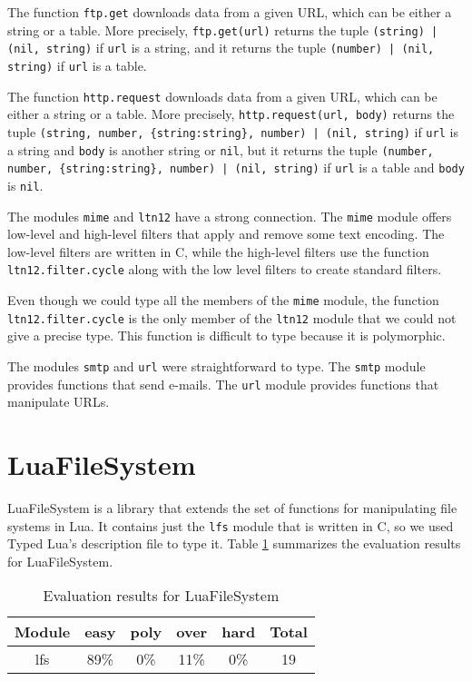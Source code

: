 The function \texttt{ftp.get} downloads data from a given URL,
which can be either a string or a table.
More precisely, \texttt{ftp.get(url)} returns the tuple
\texttt{(string) | (nil, string)} if \texttt{url} is a string,
and it returns the tuple \texttt{(number) | (nil, string)} if
\texttt{url} is a table.

The function \texttt{http.request} downloads data from a given URL,
which can be either a string or a table.
More precisely, \texttt{http.request(url, body)} returns the tuple
\texttt{(string, number, \{string:string\}, number) | (nil, string)}
if \texttt{url} is a string and \texttt{body} is another string or \texttt{nil},
but it returns the tuple
\texttt{(number, number, \{string:string\}, number) | (nil, string)}
if \texttt{url} is a table and \texttt{body} is \texttt{nil}.

The modules \texttt{mime} and \texttt{ltn12} have a strong connection.
The \texttt{mime} module offers low-level and high-level filters
that apply and remove some text encoding.
The low-level filters are written in C, while the high-level filters
use the function \texttt{ltn12.filter.cycle} along with the low level
filters to create standard filters.

Even though we could type all the members of the \texttt{mime} module,
the function \texttt{ltn12.filter.cycle} is the only member of the
\texttt{ltn12} module that we could not give a precise type.
This function is difficult to type because it is polymorphic.

The modules \texttt{smtp} and \texttt{url} were straightforward to type.
The \texttt{smtp} module provides functions that send e-mails.
The \texttt{url} module provides functions that manipulate URLs.

\section{LuaFileSystem}

LuaFileSystem is a library that extends the set of functions
for manipulating file systems in Lua.
It contains just the \texttt{lfs} module that is written in C,
so we used Typed Lua's description file to type it.
Table \ref{tab:evallfs} summarizes the evaluation results for LuaFileSystem.

\begin{table}[!ht]
\begin{center}
\begin{tabular}{|c|c|c|c|c|c|}
\hline
\textbf{Module} & \textbf{easy} & \textbf{poly} & \textbf{over} & \textbf{hard} & \textbf{Total} \\
\hline
lfs & 89\% & 0\% & 11\% & 0\% & 19 \\ %
\hline
\end{tabular}
\end{center}
\caption{Evaluation results for LuaFileSystem}
\label{tab:evallfs}
\end{table}

